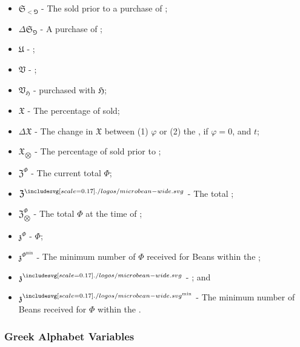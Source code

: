 \documentclass[class=article, crop=false]{standalone}
\begin{document}
\begin{itemize}[topsep=0pt, itemsep=3pt,leftmargin=16pt]
    \item[] $\mathfrak{S}_{<\Game}$ - \hypertarget{ht175}{The  sold prior to a purchase of };
    \item[] $\Delta \mathfrak{S}_{\Game}$ - \hypertarget{ht61}{A purchase of };
    \item[] $\mathfrak{U}$ - \hypertarget{ht209}{ };
    \item[] $\mathfrak{V}$ - \hypertarget{ht217}{};
    \item[] $\mathfrak{V}_\mathfrak{H}$ - \hypertarget{ht218}{ purchased with  $\mathfrak{H}$};
    \item[] $\mathfrak{X}$ - \hypertarget{ht225}{The percentage of  sold};
    \item[] $\Delta \mathfrak{X}$ - \hypertarget{ht62}{The change in $\mathfrak{X}$ between (1) $\varphi$ or (2) the , if $\varphi = 0$, and $t$};
    \item[] $\mathfrak{X}_{\bigotimes}$ - \hypertarget{ht226}{The percentage of  sold prior to };
    \item[] $\mathfrak{Z}^{\Phi}$ - \hypertarget{ht230}{The current total  $\Phi$};
    \item[] $\mathfrak{Z}^{\bean}$ - \hypertarget{ht229}{The total  \Bean};
    \item[] $\mathfrak{Z}_{\bigotimes}^{\Phi}$ - \hypertarget{ht232}{The total  $\Phi$ at the time of };
    \item[] $\mathfrak{z}^{\Phi}$ - \hypertarget{ht235}{ $\Phi$};
    \item[] $\mathfrak{z}^{\Phi^{\text{min}}}$ - \hypertarget{ht236}{The minimum number of  $\Phi$ received for    Beans within the };
    \item[] $\mathfrak{z}^{\bean}$ - \hypertarget{ht233}{ \Bean}; and
    \item[] $\mathfrak{z}^{\bean^{\text{min}}}$ - \hypertarget{ht234}{The minimum number of  Beans received for    $\Phi$ within the }.
\end{itemize}

\subsubsection{Greek Alphabet Variables}
\end{document}
